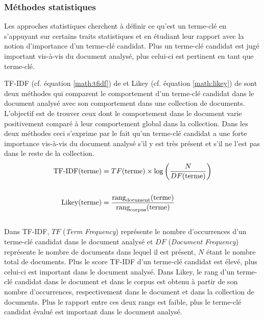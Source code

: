       \subsubsection{Méthodes statistiques}
      \label{subsubsec:main-state_of_the_art-automatic_keyphrase_extraction-unsupervised_keyphrase_extraction-statistical_approaches}
        Les approches statistiques cherchent à définir ce qu'est un terme-clé en s'appuyant sur certains
        traits statistiques et en étudiant leur rapport avec la notion
        d'importance d'un terme-clé candidat. Plus un terme-clé candidat est
        jugé important vis-à-vis du document analysé, plus celui-ci est
        pertinent en tant que terme-clé.

        TF-IDF (cf. équation \ref{math:tfidf}) de  et
        Likey (cf. équation \ref{math:likey}) de 
        sont deux méthodes qui comparent le comportement d'un terme-clé
        candidat dans le document analysé avec son comportement dans une
        collection de documents. L'objectif est de trouver ceux dont le
        comportement dans le document varie positivement comparé à leur
        comportement global dans la collection. Dans les deux méthodes ceci
        s'exprime par le fait qu'un terme-clé candidat a une forte importance
        vis-à-vis du document analysé s'il y est très présent et s'il ne l'est
        pas dans le reste de la collection.
        \begin{align}
          \text{TF-IDF}(\text{terme}) &= TF(\text{terme}) \times \log\left(\frac{N}{DF(\text{terme})}\right) \label{math:tfidf}\\
          \notag\\
          \text{Likey}(\text{terme}) &= \frac{\text{rang}_{\text{document}}(\text{terme})}{\text{rang}_{\text{corpus}}(\text{terme})} \label{math:likey}
        \end{align}\\
        Dans TF-IDF, $TF$ (\textit{Term Frequency}) représente le nombre
        d'occurrences d'un terme-clé candidat dans le document analysé et $DF$
        (\textit{Document Frequency}) représente le nombre de documents dans
        lequel il est présent, $N$ étant le nombre total de documents. Plus le
        score TF-IDF d'un terme-clé candidat est élevé, plus celui-ci est
        important dans le document analysé. Dans Likey, le rang d'un terme-clé
        candidat dans le document et dans le corpus est obtenu à partir de son
        nombre d'occurrences, respectivement dans le document et dans la
        collection de documents. Plus le rapport entre ces deux rangs est
        faible, plus le terme-clé candidat évalué est important dans le
        document analysé.

